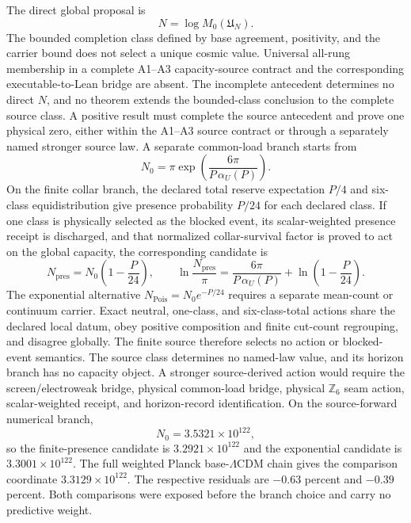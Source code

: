 The direct global proposal is
\[
N=\log M_0(\mathfrak U_N).
\]
The bounded completion class defined by base agreement, positivity, and the
carrier bound does not select a unique cosmic value. Universal all-rung
membership in a complete A1--A3 capacity-source contract and the corresponding
executable-to-Lean bridge are absent. The incomplete antecedent determines no
direct \(N\), and no theorem extends the bounded-class conclusion to the
complete source class. A
positive result must complete the source antecedent and prove one physical
zero, either within the A1--A3 source contract or through a separately
named stronger source law. A separate
common-load branch starts from
\[
N_0=\pi\exp\!\left(\frac{6\pi}{P\,\alpha_U(P)}\right).
\]
On the finite collar branch, the declared total reserve expectation \(P/4\)
and six-class equidistribution give presence probability \(P/24\) for each
declared class. If one class is physically selected as the blocked event, its
scalar-weighted presence receipt is discharged, and that normalized
collar-survival factor is proved to act on the global capacity, the
corresponding candidate is
\[
N_{\mathrm{pres}}=N_0\left(1-\frac{P}{24}\right),
\qquad
\ln\frac{N_{\mathrm{pres}}}{\pi}
=
\frac{6\pi}{P\,\alpha_U(P)}
+\ln\left(1-\frac{P}{24}\right).
\]
The exponential alternative \(N_{\mathrm{Pois}}=N_0e^{-P/24}\) requires a
separate mean-count or continuum carrier. Exact neutral, one-class, and
six-class-total actions share the declared local datum, obey positive
composition and finite cut-count regrouping, and disagree globally. The
finite source therefore selects no action or blocked-event semantics. The
source class determines no named-law value, and its horizon branch has no
capacity object. A stronger source-derived action would
require the screen/electroweak bridge, physical common-load bridge, physical
\(\mathbb Z_6\) seam action, scalar-weighted receipt, and horizon-record
identification. On the source-forward numerical
branch,
\[
N_0=3.5321\times10^{122},
\]
so the finite-presence candidate is
\(3.2921\times10^{122}\) and the exponential candidate is
\(3.3001\times10^{122}\). The full weighted Planck
base-\(\Lambda\)CDM chain gives the comparison coordinate
\(3.3129\times10^{122}\). The respective residuals are
\(-0.63\) percent and \(-0.39\) percent. Both comparisons were exposed before
the branch choice and carry no predictive weight.

